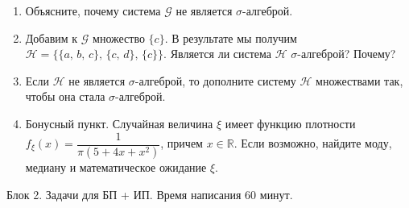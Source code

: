 \documentclass[12pt]{article}
\begin{document}
\begin{enumerate}
\begin{enumerate}

     \item Объясните, почему система $\mathcal{G}$ не является $\sigma$-алгеброй.

    \item Добавим к $\mathcal{G}$ множество $\{c\}$. 
    В результате мы получим $\mathcal{H} = \bigl\{ \{a, \, b, \, c\}, \, \{c, \, d\}, \, \{c\}\bigr\}$. 
    Является ли система $\mathcal{H}$ $\sigma$-алгеброй? Почему?

    \item Если $\mathcal{H}$ не является $\sigma$-алгеброй, 
    то дополните систему $\mathcal{H}$ множествами так, чтобы она стала $\sigma$-алгеброй.

    \item Бонусный пункт. Случайная величина $\xi$ имеет функцию плотности
    $f_{\xi}(x) = 
    \dfrac{1}{\pi(5+4x+x^2)}
    $, причем $x \in \mathbb{R}$. 
    Если возможно, найдите моду, медиану и математическое ожидание $\xi$.
\end{enumerate}

\end{enumerate}




\newpage

Блок 2. Задачи для БП + ИП. Время написания 60 минут. 
\end{document}
